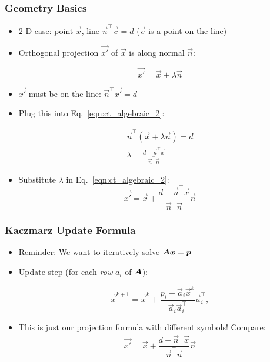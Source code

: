 \begin{frame}
	\frametitle{Geometry Basics}

	\begin{itemize}
		\item 2-D case: point $\vec x$, line $\vec n^\top\vec c = d$ ($\vec c$ is a point on the line)
		\item Orthogonal projection $\vec{x'}$ of $\vec{x}$ is along normal $\vec n$:

		      \begin{equation}
			      \label{eqn:ct_algebraic_2}
			      \vec{x'} = \vec{x} + \lambda \vec{n}
		      \end{equation}

		\item $\vec{x'}$ must be on the line: $\vec{n}^\top\vec{x'} = d$

		\item Plug this into Eq.~\ref{eqn:ct_algebraic_2}:

		      \begin{eqnarray}
			      \vec{n}^\top(\vec{x} + \lambda \vec{n}) = d\\
			      \lambda = \frac{d-\vec{n}^\top\vec{x}}{\vec{n}^\top\vec{n}}
		      \end{eqnarray}

		\item Substitute $\lambda$ in Eq.~\ref{eqn:ct_algebraic_2}:
		      \begin{equation}
			      \vec{x'} = \vec{x} + \frac{d - \vec{n}^\top \vec{x}}{\vec{n}^\top\vec{n}}\vec{n}
		      \end{equation}

	\end{itemize}

\end{frame}

\begin{frame}

	\frametitle{Kaczmarz Update Formula}

	\begin{itemize}

		\item Reminder: We want to iteratively solve $\bm A \boldsymbol{x} = \boldsymbol{p}$

		\item Update step (for each \emph{row} $a_i$ of $\bm A$):

		      \begin{equation}
			      \vec{x}^{k+1} = \vec{x}^k + \frac{p_i - \vec{a}_i\vec{x}^k}{\vec{a}_i\vec{a}^\top_i}\vec{a}^\top_i,
		      \end{equation}

		\item This is just our projection formula with different symbols! Compare:
		      \begin{equation}
			      \vec{x'} = \vec{x} + \frac{d - \vec{n}^\top \vec{x}}{\vec{n}^\top\vec{n}}\vec{n}
		      \end{equation}

	\end{itemize}

\end{frame}

